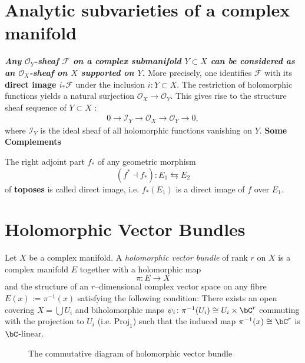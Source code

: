 \section{Analytic subvarieties of a complex manifold}
\textit{\textbf{Any $\mathcal{O}_Y$-sheaf $\mathcal{F}$ on a complex submanifold $Y \subset X$ can be considered as an $\mathcal{O}_X$-sheaf on $X$ supported on $Y$.}} More precisely, one identifies $\mathcal{F}$ with its \textbf{\color{purple} direct image $i_* \mathcal{F}$} under the inclusion $i: Y \subset X$. The restriction of holomorphic functions yields a natural surjection $\mathcal{O}_X \rightarrow \mathcal{O}_Y$. This gives rise to the structure sheaf sequence of $Y \subset X$ :
\begin{align*}
0 \longrightarrow \mathcal{I}_Y \longrightarrow \mathcal{O}_X \longrightarrow \mathcal{O}_Y \longrightarrow 0,
\end{align*}
where $\mathcal{I}_Y$ is the ideal sheaf of all holomorphic functions vanishing on $Y$.
\textbf{Some Complements}

\begin{definition}
The right adjoint part $f_*$ of any geometric morphism 
\[
  (f^*\dashv f_*) \colon E_1 \leftrightarrows E_2
\]
of \textbf{toposes} is called direct image, i.e. $f_* (E_1)$ is a direct image of $f$ over $E_1$.
\end{definition}

\section{Holomorphic Vector Bundles}
\begin{definition}
  Let $X$ be a complex manifold. A \textit{holomorphic vector bundle} of rank $r$ on $X$ is a complex manifold $E$ together with a holomorphic map
  \[\pi\colon E\to X\]
  and the structure of an $r$--dimensional complex vector space on any fibre $E(x):=\pi^{-1}(x)$ satisfying the following condition: There exists an open covering $X=\bigcup U_i$ and biholomorphic maps $\psi_i\colon \pi^{-1} (U_i) \cong  U_i\times \bC^r$ commuting with the projection to $U_i$ (i.e. $\textrm{Proj}_1$) such that the induced map $\pi^{-1}(x)\cong  \bC^r$ is $\bC$-linear.
\end{definition}
  \begin{figure}[htb]
    \centering
    \caption{The commutative diagram of holomorphic vector bundle}
    \label{fig:The commutative diagram of holomorphic vector bundle}
  \end{figure}

